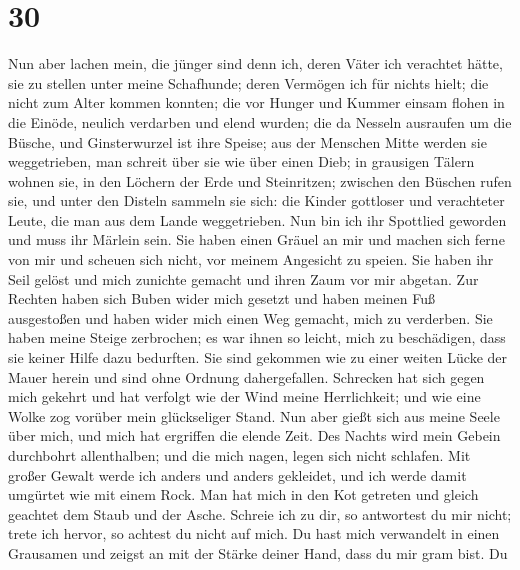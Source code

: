 \hypertarget{section-29}{%
\section{30}\label{section-29}}

 Nun aber lachen mein, die jünger sind denn ich, deren
Väter ich verachtet hätte, sie zu stellen unter meine Schafhunde;
 deren Vermögen ich für nichts hielt; die nicht zum Alter
kommen konnten;  die vor Hunger und Kummer einsam flohen
in die Einöde, neulich verdarben und elend wurden;  die da
Nesseln ausraufen um die Büsche, und Ginsterwurzel ist ihre Speise;
 aus der Menschen Mitte werden sie weggetrieben, man
schreit über sie wie über einen Dieb;  in grausigen Tälern
wohnen sie, in den Löchern der Erde und Steinritzen; 
zwischen den Büschen rufen sie, und unter den Disteln sammeln sie sich:
 die Kinder gottloser und verachteter Leute, die man aus
dem Lande weggetrieben.  Nun bin ich ihr Spottlied
geworden und muss ihr Märlein sein.  Sie haben einen
Gräuel an mir und machen sich ferne von mir und scheuen sich nicht, vor
meinem Angesicht zu speien.  Sie haben ihr Seil gelöst
und mich zunichte gemacht und ihren Zaum vor mir abgetan.
 Zur Rechten haben sich Buben wider mich gesetzt und
haben meinen Fuß ausgestoßen und haben wider mich einen Weg gemacht,
mich zu verderben.  Sie haben meine Steige zerbrochen; es
war ihnen so leicht, mich zu beschädigen, dass sie keiner Hilfe dazu
bedurften.  Sie sind gekommen wie zu einer weiten Lücke
der Mauer herein und sind ohne Ordnung dahergefallen. 
Schrecken hat sich gegen mich gekehrt und hat verfolgt wie der Wind
meine Herrlichkeit; und wie eine Wolke zog vorüber mein glückseliger
Stand.  Nun aber gießt sich aus meine Seele über mich,
und mich hat ergriffen die elende Zeit.  Des Nachts wird
mein Gebein durchbohrt allenthalben; und die mich nagen, legen sich
nicht schlafen.  Mit großer Gewalt werde ich anders und
anders gekleidet, und ich werde damit umgürtet wie mit einem Rock.
 Man hat mich in den Kot getreten und gleich geachtet dem
Staub und der Asche.  Schreie ich zu dir, so antwortest
du mir nicht; trete ich hervor, so achtest du nicht auf mich.
 Du hast mich verwandelt in einen Grausamen und zeigst an
mit der Stärke deiner Hand, dass du mir gram bist.  Du
